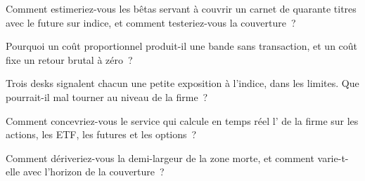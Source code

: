 \begin{interviewq}\label{iq:hf:hedging-and-inventory-in-practice:2}
Comment estimeriez-vous les bêtas servant à couvrir un carnet de quarante titres avec le future sur indice, et comment testeriez-vous la couverture~?
\end{interviewq}

\begin{interviewq}\label{iq:hf:hedging-and-inventory-in-practice:3}
Pourquoi un coût proportionnel produit-il une bande sans transaction, et un coût fixe un retour brutal à zéro~?
\end{interviewq}

\begin{interviewq}\label{iq:hf:hedging-and-inventory-in-practice:4}
Trois desks signalent chacun une petite exposition à l'indice, dans les limites. Que pourrait-il mal tourner au niveau de la firme~?
\end{interviewq}

\begin{interviewq}\label{iq:hf:hedging-and-inventory-in-practice:5}
Comment concevriez-vous le service qui calcule en temps réel l' de la firme sur les actions, les ETF, les futures et les options~?
\end{interviewq}

\begin{interviewq}\label{iq:hf:hedging-and-inventory-in-practice:6}
Comment dériveriez-vous la demi-largeur de la zone morte, et comment varie-t-elle avec l'horizon de la couverture~?
\end{interviewq}
